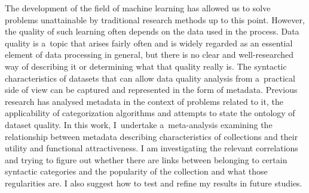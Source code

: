 \begin{abstract-en}
	The development of the field of machine learning has allowed us to solve problems unattainable by traditional research methods up to this point.
	However, the quality of such learning often depends on the data used in the process.
	Data quality is a~topic that arises fairly often and is widely regarded as an essential element of data processing in general, but there is no clear and well-researched way of describing it or determining what that quality really is.
	The syntactic characteristics of datasets that can allow data quality analysis from a~practical side of view can be captured and represented in the form of metadata.
	Previous research has analysed metadata in the context of problems related to it, the applicability of categorization algorithms and attempts to state the ontology of dataset quality.
	In this work, I~undertake a~meta-analysis examining the relationship between metadata describing characteristics of collections and their utility and functional attractiveness.
	I am investigating the relevant correlations and trying to figure out whether there are links between belonging to certain syntactic categories and the popularity of the collection and what those regularities are.
	I also suggest how to test and refine my results in future studies.
\end{abstract-en}
